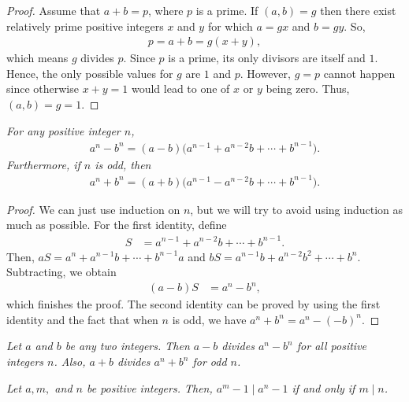 \documentclass{subfile}
\begin{document}
	\begin{proof}
		Assume that $a+b=p$, where $p$ is a prime. If $(a,b)=g$ then there exist relatively prime positive integers $x$ and $y$ for which $a=gx$ and $b=gy$. So,
		\begin{align*}
			p = a+b = g(x+y),
		\end{align*}
		which means $g$ divides $p$. Since $p$ is a prime, its only divisors are itself and $1$. Hence, the only possible values for $g$ are $1$ and $p$. However, $g=p$ cannot happen since otherwise $x+y=1$ would lead to one of $x$ or $y$ being zero. Thus, $(a,b)=g=1$.
	\end{proof}


	\begin{theorem}\slshape\label{id:fatandthin}
		For any positive integer $n$,
		\begin{align*}
			a^n-b^n=(a-b)\Big(a^{n-1}+a^{n-2}b+\cdots+b^{n-1}\Big).
		\end{align*}
		Furthermore, if $n$ is odd, then
		\begin{align*}
			a^n+b^n=(a+b)\Big(a^{n-1}-a^{n-2}b+\cdots+b^{n-1}\Big).
		\end{align*}
		\label{thm:powDiv}
	\end{theorem}
	\begin{proof}
		We can just use induction on $n$, but we will try to avoid using induction as much as possible. For the first identity, define
		\begin{align*}
			S & =a^{n-1}+a^{n-2}b+\cdots+b^{n-1}.
		\end{align*}
		Then, $aS=a^n+a^{n-1}b+\cdots+b^{n-1}a$ and $bS=a^{n-1}b+a^{n-2}b^2+\cdots+b^n$. Subtracting, we obtain
		\begin{align*}
			(a-b)S & =a^n-b^n,
		\end{align*}
		which finishes the proof. The second identity can be proved by using the first identity and the fact that when $n$ is odd, we have $a^n+b^n=a^n-(-b)^n$.
	\end{proof}

	\begin{corollary}\slshape
		\label{cor:a-b|a^n-b^n}
		Let $a$ and $b$ be any two integers. Then $a-b$ divides $a^n-b^n$ for all positive integers $n$. Also, $a+b$ divides $a^n+b^n$ for odd $n$.
	\end{corollary}


	\begin{theorem}\slshape\label{thm:powerdiv}
		Let $a,m,$ and $n$ be positive integers. Then, $a^m-1\mid a^n-1$ if and only if $m\mid n$.
	\end{theorem}
\end{document}

